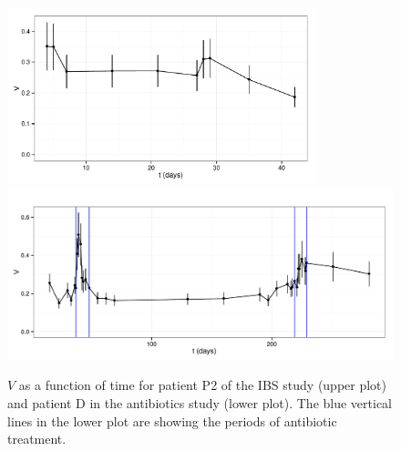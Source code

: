 \begin{figure}
	\centering 
 	\includegraphics[width=0.8\textwidth]{results/sliwin/patP2_IBS.pdf}
  	\includegraphics[width=1.0\textwidth]{results/sliwin/patD_antibio.pdf} 
\caption{$V$ as a function of time for patient P2 of the IBS study\cite{IBS} (upper plot) and patient D in the antibiotics study\cite{antibiotic} (lower plot). The blue vertical lines in the lower plot are showing the periods of antibiotic treatment.}
\label{fig:tempevo2}
\end{figure}
